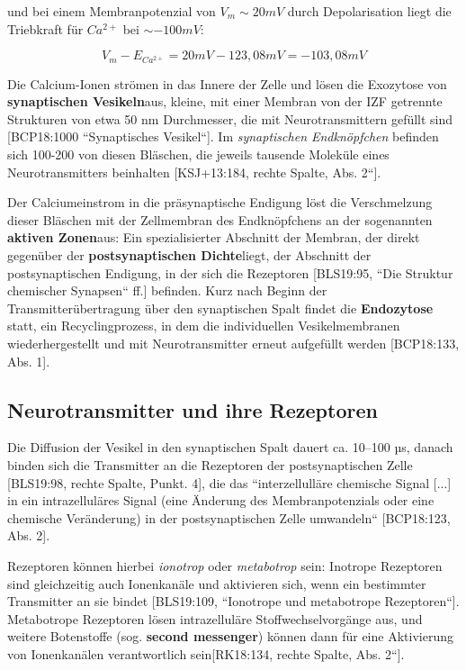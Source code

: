 {{\pagebreak

und bei einem Membranpotenzial von $V_m \sim 20 mV$ durch Depolarisation liegt die Triebkraft für $Ca^{2+}$ bei $\sim -100 mV$:

\begin{equation}
 V_m - E_{Ca^{2+}} = 20 mV - 123,08 mV = -103,08 mV
 \label{eq:gl-triebkraftca2}
\end{equation}


Die Calcium-Ionen strömen in das Innere der Zelle und lösen die Exozytose von \textbf{synaptischen Vesikeln}\footnotemark[56] aus, kleine, mit einer Membran von der IZF getrennte Strukturen von etwa 50 nm Durchmesser, die mit Neurotransmittern gefüllt sind [BCP18:1000 ``Synaptisches Vesikel``].
Im \textit{synaptischen Endknöpfchen} befinden sich 100-200 von diesen Bläschen, die jeweils tausende Moleküle eines Neurotransmitters beinhalten [KSJ+13:184, rechte Spalte, Abs. 2``].

Der Calciumeinstrom in die präsynaptische Endigung löst die Verschmelzung dieser Bläschen mit der Zellmembran des Endknöpfchens an der sogenannten \textbf{aktiven Zonen}\footnotemark[57] aus: Ein spezialisierter Abschnitt der Membran, der direkt gegenüber der \textbf{postsynaptischen Dichte}\footnotemark[58] liegt, der Abschnitt der postsynaptischen Endigung, in der sich die Rezeptoren [BLS19:95, ``Die Struktur chemischer Synapsen`` ff.] befinden.
Kurz nach Beginn der Transmitterübertragung über den synaptischen Spalt findet die \textbf{Endozytose} statt, ein Recyclingprozess, in dem die individuellen Vesikelmembranen wiederhergestellt und mit Neurotransmitter erneut aufgefüllt werden [BCP18:133, Abs. 1].



\subsection{Neurotransmitter und ihre Rezeptoren}

Die Diffusion der Vesikel in den synaptischen Spalt dauert ca. 10–100 µs, danach binden sich die Transmitter an die Rezeptoren der postsynaptischen Zelle [BLS19:98, rechte Spalte, Punkt. 4], die das ``interzellulläre chemische Signal [...] in ein intrazelluläres Signal (eine Änderung des Membranpotenzials oder eine chemische Veränderung) in der postsynaptischen Zelle umwandeln`` [BCP18:123, Abs. 2].

Rezeptoren können hierbei \textit{ionotrop} oder \textit{metabotrop} sein: Inotrope Rezeptoren sind gleichzeitig auch Ionenkanäle und aktivieren sich, wenn ein bestimmter Transmitter an sie bindet  [BLS19:109, ``Ionotrope und metabotrope Rezeptoren``]. 
Metabotrope Rezeptoren lösen intrazelluläre Stoffwechselvorgänge aus, und weitere Botenstoffe (sog. \textbf{second messenger}) können dann für eine Aktivierung von Ionenkanälen verantwortlich sein[RK18:134, rechte Spalte, Abs. 2``]\footnotemark[59].

}}
